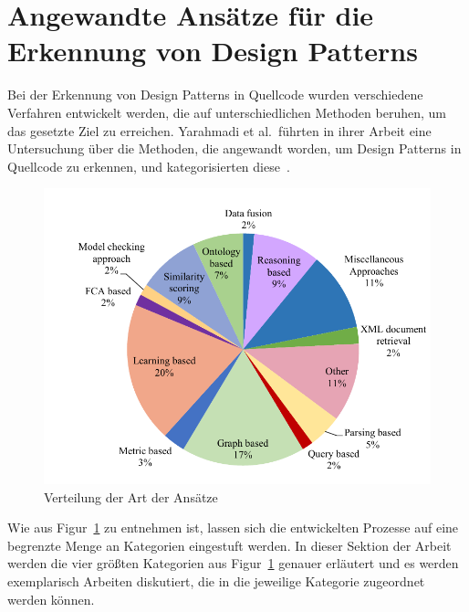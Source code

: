 \section{Angewandte Ansätze für die Erkennung von Design Patterns}

Bei der Erkennung von Design Patterns in Quellcode wurden verschiedene Verfahren entwickelt werden, die auf unterschiedlichen Methoden beruhen, um das gesetzte Ziel zu erreichen.
Yarahmadi et al.~führten in ihrer Arbeit eine Untersuchung über die Methoden, die angewandt worden, um Design Patterns in Quellcode zu erkennen, und kategorisierten diese~\cite[S. 5805]{yarahmadi2020design}.

\begin{figure}[h]
    \centering
    \includegraphics[scale=0.5]{figures/approches_distribution.png}
    \caption{Verteilung der Art der Ansätze}
    \label{fig:approach_dist}
\end{figure}

Wie aus Figur~\ref{fig:approach_dist} zu entnehmen ist, lassen sich die entwickelten Prozesse auf eine begrenzte Menge an Kategorien eingestuft werden.
In dieser Sektion der Arbeit werden die vier größten Kategorien aus Figur~\ref{fig:approach_dist} genauer erläutert und es werden exemplarisch Arbeiten diskutiert,
die in die jeweilige Kategorie zugeordnet werden können.  



